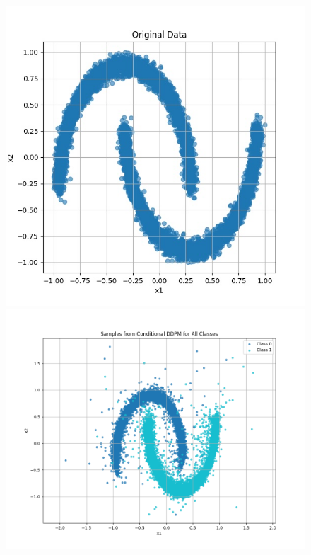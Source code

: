 \documentclass[a4paper,12pt]{article}
\begin{document}
\begin{figure}[H]
  \centering
  \begin{minipage}{0.3\textwidth}
      \centering
      \includegraphics[width=\linewidth]{images/moon.jpg}
  \end{minipage}
  \begin{minipage}{0.3\textwidth}
      \centering
      \includegraphics[width=\linewidth]{"images/Samples - CFG for cond_ddpm_2_50_0.0001_0.02_moons_0.0_sigmoid.png"}

\end{minipage}
\end{figure}
\end{document}
